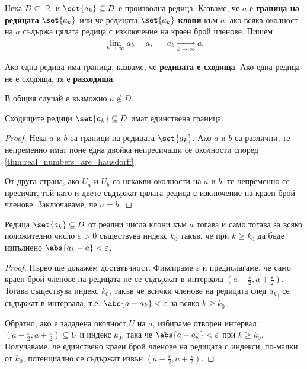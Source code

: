 \documentclass{../../common/topic}
\begin{document}
\begin{definition}
  Нека \( D \subseteq \BbbR \) и \( \set{ a_k } \subseteq D \) е произволна редица. Казваме, че \( a \) е \textbf{граница на редицата} \( \set{ a_k } \) или че редицата \( \set{ a_k } \) \textbf{клони} към \( a \), ако всяка околност на \( a \) съдържа цялата редица с изключение на краен брой членове. Пишем
  \begin{align*}
    \lim_{k \to \infty} a_k = a,
    &&
    a_k \xrightarrow[k \to \infty]{} a.
  \end{align*}

  Ако една редица има граница, казваме, че \textbf{редицата е сходяща}. Ако една редица не е сходяща, тя е \textbf{разходяща}.
\end{definition}

\begin{remark}
  В общия случай е възможно \( a \not\in D \).
\end{remark}

\begin{proposition}
  Сходящите редици \( \set{ a_k } \subseteq D \) имат единствена граница.
\end{proposition}
\begin{proof}
  Нека \( a \) и \( b \) са граници на редицата \( \set{ a_k } \). Ако \( a \) и \( b \) са различни, те непременно имат поне една двойка непресичащи се околности според \cref{thm:real_numbers_are_hausdorff}.

  От друга страна, ако \( U_a \) и \( U_b \) са някакви околности на \( a \) и \( b \), те непременно се пресичат, тъй като и двете съдържат цялата редица с изключение на краен брой членове. Заключаваме, че \( a = b \).
\end{proof}

\begin{proposition}\label{thm:sequence_converges_in_topology_iff_converges_in_base}
  Редица \( \set{ a_k } \subseteq D \) от реални числа клони към \( a \) тогава и само тогава за всяко положително число \( \varepsilon > 0 \) съществува индекс \( k_0 \) такъв, че при \( k \geq k_0 \) да бъде изпълнено \( \abs{a_k - a} < \varepsilon \).
\end{proposition}
\begin{proof}
  Първо ще докажем достатъчност. Фиксираме \( \varepsilon \) и предполагаме, че само краен брой членове на редицата не се съдържат в интервала \( (a - \tfrac{\varepsilon} 2, a + \tfrac{\varepsilon} 2) \). Тогава съществува индекс \( k_0 \), такъв че всички членове на редицата след \( a_{k_0} \) се съдържат в интервала, т.е. \( \abs{a - a_k} < \varepsilon \) за всяко \( k \geq k_0 \).

  Обратно, ако е зададена околност \( U \) на \( a \), избираме отворен интервал \( (a - \tfrac \varepsilon 2, a + \tfrac \varepsilon 2) \subseteq U \) и индекс \( k_0 \), така че \( \abs{a - a_k} < \varepsilon \) при \( k \geq k_0 \). Получаваме, че единствено краен брой членове на редицата с индекси, по-малки от \( k_0 \), потенциално се съдържат извън \( (a - \tfrac \varepsilon 2, a + \tfrac \varepsilon 2) \).
\end{proof}
\end{document}

